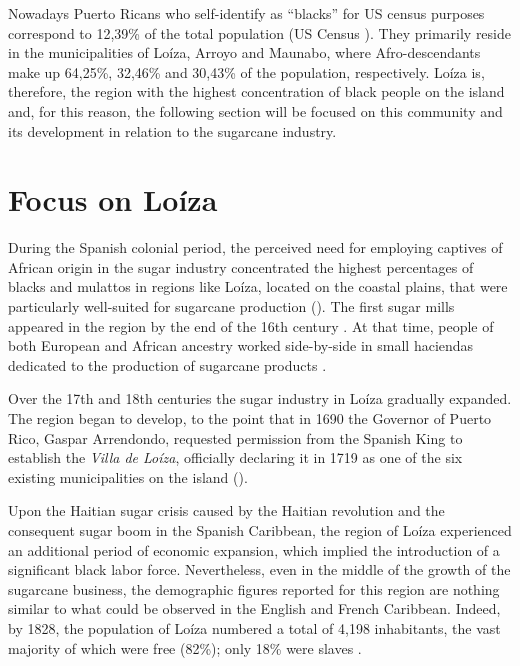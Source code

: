 \documentclass[output=paper,colorlinks,citecolor=brown]{langscibook}
\begin{document}
Nowadays Puerto Ricans who self-identify as “blacks” for US census purposes correspond to 12,39\% of the total population (US Census \citeyear{UScensus2010}). They primarily reside in the municipalities of Loíza, Arroyo and Maunabo, where Afro-de\-scen\-dants make up 64,25\%, 32,46\% and 30,43\% of the population, respectively. Loíza is, therefore, the region with the highest concentration of black people on the island and, for this reason, the following section will be focused on this community and its development in relation to the sugarcane industry. 

\section{Focus on Loíza}

During the Spanish colonial period, the perceived need for employing captives of African origin in the sugar industry concentrated the highest percentages of blacks and mulattos in regions like Loíza, located on the coastal plains, that were particularly well-suited for sugarcane production (\citealt{Mayo-Santana_Negrón-Portillo2007}). The first sugar mills appeared in the region by the end of the 16th century \citep{Ungerleider2000}. At that time, people of both European and African ancestry worked side-by-side in small haciendas dedicated to the production of sugarcane products \citep{MauleónBenítez1974}.

Over the 17th and 18th centuries the sugar industry in Loíza gradually expanded. The region began to develop, to the point that in 1690 the Governor of Puerto Rico, Gaspar Arrendondo, requested permission from the Spanish King to establish the \textit{Villa de Loíza}, officially declaring it in 1719 as one of the six existing municipalities on the island (\citealt{MauleónBenítez1974,Ungerleider2000}).

Upon the Haitian sugar crisis caused by the Haitian revolution and the consequent sugar boom in the Spanish Caribbean, the region of Loíza experienced an additional period of economic expansion, which implied the introduction of a significant black labor force. Nevertheless, even in the middle of the growth of the sugarcane business, the demographic figures reported for this region are nothing similar to what could be observed in the English and French Caribbean. Indeed, by 1828, the population of Loíza numbered a total of 4,198 inhabitants, the vast majority of which were free (82\%); only 18\% were slaves \citep[39--40]{Ungerleider2000}. 
\end{document}
